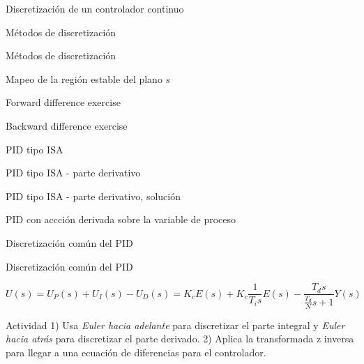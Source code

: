 \documentclass[presentation,aspectratio=1610]{beamer}
\begin{document}
\begin{frame}[label={sec:org86d23da}]{Discretización de un controlador continuo}
\begin{frame}[label={sec:org3ca2082}]{Métodos de discretización}
\begin{frame}[label={sec:orga78cff2}]{Métodos de discretización}
\begin{frame}[label={sec:org28bff53}]{Mapeo de la región estable del plano \(s\)}
\begin{frame}[label={sec:org9bb57fa}]{Forward difference exercise}
\begin{frame}[label={sec:orgaf8c1b0}]{Backward difference exercise}
\begin{frame}[label={sec:orgb2215e6}]{PID tipo ISA}
\begin{frame}[label={sec:orga06296a}]{PID tipo ISA - parte derivativo}
\begin{frame}[label={sec:org978e098}]{PID tipo ISA - parte derivativo, solución}
\begin{frame}[label={sec:orgf3b475b}]{PID con accción derivada sobre la variable de proceso}
\begin{frame}[label={sec:org5c3258e}]{Discretización común del PID}
\begin{frame}[label={sec:org190dd76}]{Discretización común del PID}
\begin{center}
\end{center}

\[ U(s) = U_P(s) + U_I(s) - U_D(s) = K_cE(s) + K_c\frac{1}{T_i s} E(s) - \frac{T_d s}{\frac{T_d}{N} s + 1}Y(s) \]

\alert{Actividad} 1) Usa \emph{Euler hacia adelante} para discretizar el parte integral y \emph{Euler hacia atrás} para discretizar el parte derivado. 2) Aplica la transformada z inversa para llegar a una ecuación de diferencias para el controlador.
\end{frame}


\end{frame}
\end{frame}
\end{frame}
\end{frame}
\end{frame}
\end{frame}
\end{frame}
\end{frame}
\end{frame}
\end{frame}
\end{frame}
\end{document}
